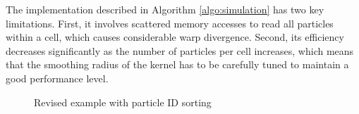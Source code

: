 \noindent
The implementation described in Algorithm \ref{algo:simulation} has two key limitations. First, it involves scattered memory accesses to read all particles within a cell, which causes considerable warp divergence. Second, its efficiency decreases significantly as the number of particles per cell increases, which means that the smoothing radius of the kernel has to be carefully tuned to maintain a good performance level.
\begin{figure}[ht!]
    \centering
    \hspace{.2in}
        \hspace{.2in}
        \hspace{.3in}
    \caption{Revised example with particle ID sorting}\label{fig:gridPicOpt}
\end{figure}

